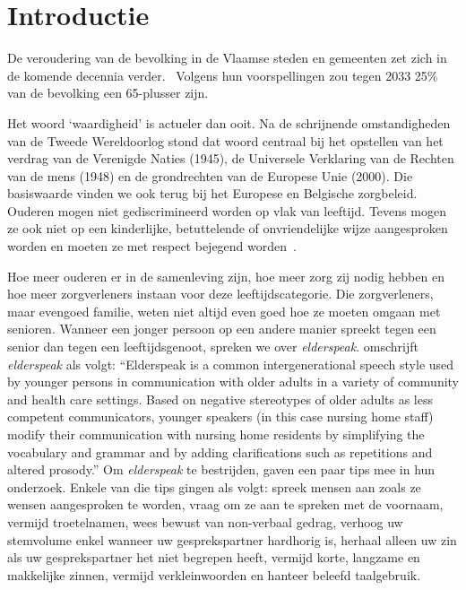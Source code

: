 

\section{Introductie}\label{sec:introductie} %

De veroudering van de bevolking in de Vlaamse steden en gemeenten zet zich in de komende  decennia verder.~\autocite{StatistiekVlaanderen2018}
Volgens hun voorspellingen zou tegen 2033 25\% van de bevolking een 65-plusser zijn.

Het woord `waardigheid' is actueler dan ooit.
Na de schrijnende omstandigheden van de Tweede Wereldoorlog stond dat woord centraal bij het opstellen van het verdrag van de Verenigde Naties (1945), de Universele Verklaring van de Rechten van de mens (1948) en de grondrechten van de Europese Unie (2000).
Die basiswaarde vinden we ook terug bij het Europese en Belgische zorgbeleid. Ouderen mogen niet gediscrimineerd worden op vlak van leeftijd. Tevens mogen ze ook niet op een kinderlijke, betuttelende of onvriendelijke wijze aangesproken worden en moeten ze met respect bejegend worden~\autocite{Campens2021}.

Hoe meer ouderen er in de samenleving zijn, hoe meer zorg zij nodig hebben en hoe meer zorgverleners instaan voor deze leeftijdscategorie.
Die zorgverleners, maar evengoed familie, weten niet altijd even goed hoe ze moeten omgaan met senioren.
Wanneer een jonger persoon op een andere manier spreekt tegen een senior dan tegen een leeftijdsgenoot, spreken we over \textit{elderspeak}. \textcite{Williams2011} omschrijft \textit{elderspeak} als volgt: ``Elderspeak is a common intergenerational speech style used by younger persons in communication with older adults in a variety of community and health care settings. Based on negative stereotypes of older adults as less competent communicators, younger speakers (in this case nursing home staff) modify their communication with nursing home residents by simplifying the vocabulary and grammar and by adding clarifications such as repetitions and altered prosody.'' Om \textit{elderspeak} te bestrijden, gaven \textcite{Wick2007} een paar tips mee in hun onderzoek.
Enkele van die tips gingen als volgt: spreek mensen aan zoals ze wensen aangesproken te worden, vraag om ze aan te spreken met de voornaam, vermijd troetelnamen, wees bewust van non-verbaal gedrag, verhoog uw stemvolume enkel wanneer uw gesprekspartner hardhorig is, herhaal alleen uw zin als uw gesprekspartner het niet begrepen heeft, vermijd korte, langzame en makkelijke zinnen, vermijd verkleinwoorden en hanteer beleefd taalgebruik.

